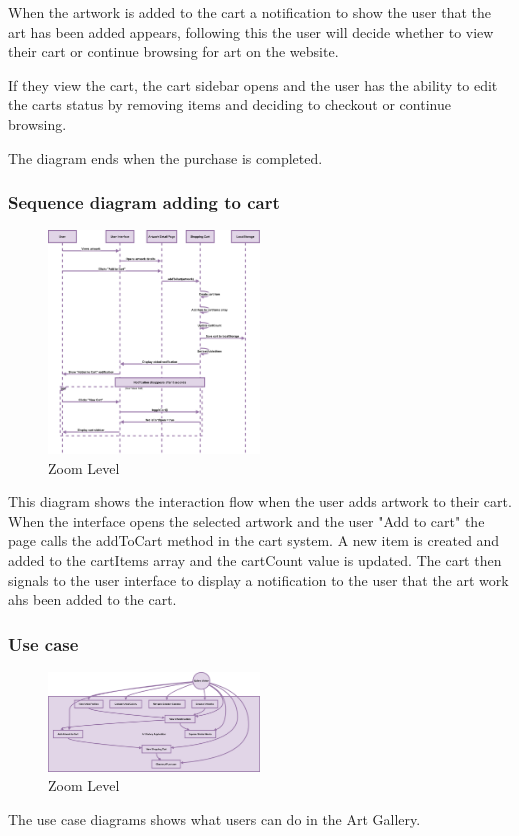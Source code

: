 \documentclass[]{project_final}
\begin{document}
When the artwork is added to the cart a notification to show the user that the art has been added appears, following this the user will decide whether to view their cart or continue browsing for art on the website.

If they view the cart, the cart sidebar opens and the user has the ability to edit the carts status by removing items and deciding to checkout or continue browsing.

The diagram ends when the purchase is completed.
\newpage
\subsubsection{Sequence diagram adding to cart}

\begin{figure}[ht!]
    \centering
    \includegraphics[width=0.5\textwidth]{AGSequenceAddingArtToCart.png}
    \vspace*{0.0cm}
    \caption{Zoom Level}
    \label{fig:1}
\end{figure}

This diagram shows the interaction flow when the user adds artwork to their cart. When the interface opens the selected artwork and the user "Add to cart" the page calls the addToCart method in the cart system. A new item is created and added to the cartItems array and the cartCount value is updated. The cart then signals to the user interface to display a notification to the user that the art work ahs been added to the cart.

\newpage
\subsubsection{Use case}

\begin{figure}[ht!]
    \centering
    \includegraphics[width=0.5\textwidth]{AGUseCase.png}
    \vspace*{0.0cm}
    \caption{Zoom Level}
    \label{fig:1}
\end{figure}
The use case diagrams shows what users can do in the Art Gallery.
\newpage
\end{document}
